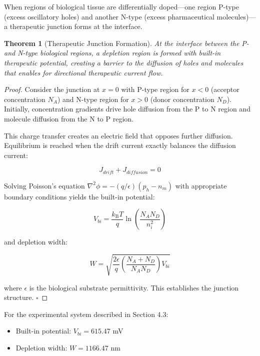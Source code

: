 \documentclass{article}
\newcommand{\kB}{k_\mathrm{B}}
\newtheorem{theorem}{Theorem}[section]
\theoremstyle{definition}
\theoremstyle{remark}
\begin{document}
When regions of biological tissue are differentially doped—one region P-type (excess oscillatory holes) and another N-type (excess pharmaceutical molecules)—a therapeutic junction forms at the interface.

\begin{theorem}[Therapeutic Junction Formation]
At the interface between the P- and N-type biological regions, a depletion region is formed with built-in therapeutic potential, creating a barrier to the diffusion of holes and molecules that enables for directional therapeutic current flow.
\end{theorem}

\begin{proof}
Consider the junction at $x = 0$ with P-type region for $x < 0$ (acceptor concentration $N_A$) and N-type region for $x > 0$ (donor concentration $N_D$). Initially, concentration gradients drive hole diffusion from the P to N region and molecule diffusion from the N to P region.

This charge transfer creates an electric field that opposes further diffusion. Equilibrium is reached when the drift current exactly balances the diffusion current:

\begin{equation}
J_{drift} + J_{diffusion} = 0
\end{equation}

Solving Poisson's equation $\nabla^2 \phi = -(q/\epsilon)(p_h - n_m)$ with appropriate boundary conditions yields the built-in potential:

\begin{equation}
V_{bi} = \frac{\kB T}{q} \ln\left(\frac{N_A N_D}{n_i^2}\right)
\label{eq:built_in_potential}
\end{equation}

and depletion width:

\begin{equation}
W = \sqrt{\frac{2\epsilon}{q}\left(\frac{N_A + N_D}{N_A N_D}\right)V_{bi}}
\label{eq:depletion_width}
\end{equation}

where $\epsilon$ is the biological substrate permittivity. This establishes the junction structure. $\square$
\end{proof}

For the experimental system described in Section 4.3:

\begin{itemize}
\item Built-in potential: $V_{bi} = 615.47$ mV
\item Depletion width: $W = 1166.47$ nm
\end{itemize}
\end{document}
